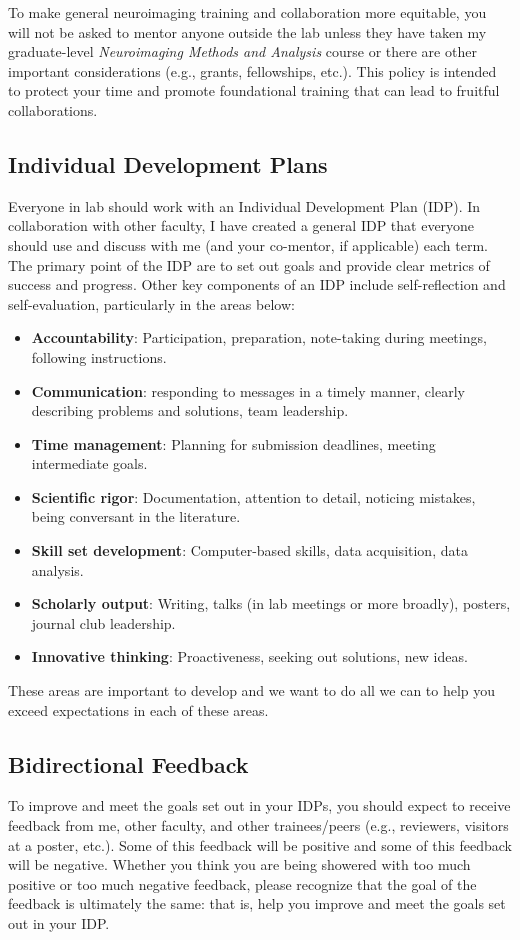 \documentclass[letterpaper,11pt,oneside]{memoir}
\begin{document}
To make general neuroimaging training and collaboration more equitable, you will not be asked to mentor anyone outside the lab unless they have taken my graduate-level \textit{Neuroimaging Methods and Analysis} course or there are other important considerations (e.g., grants, fellowships, etc.). This policy is intended to protect your time and promote foundational training that can lead to fruitful collaborations. 

\subsection{Individual Development Plans}
Everyone in lab should work with an Individual Development Plan (IDP). In collaboration with other faculty, I have created a general IDP that everyone should use and discuss with me (and your co-mentor, if applicable) each term. The primary point of the IDP are to set out goals and provide clear metrics of success and progress. Other key components of an IDP include self-reflection and self-evaluation, particularly in the areas below:

\begin{itemize}[noitemsep,nolistsep]
\item \textbf{Accountability}: Participation, preparation, note-taking during meetings, following instructions.
\item \textbf{Communication}: responding to messages in a timely manner, clearly describing problems and solutions, team leadership.
\item \textbf{Time management}: Planning for submission deadlines, meeting intermediate goals.
\item \textbf{Scientific rigor}: Documentation, attention to detail, noticing mistakes, being conversant in the literature.
\item \textbf{Skill set development}: Computer-based skills, data acquisition, data analysis.
\item \textbf{Scholarly output}: Writing, talks (in lab meetings or more broadly), posters, journal club leadership.
\item \textbf{Innovative thinking}: Proactiveness, seeking out solutions, new ideas.
\end{itemize}

These areas are important to develop and we want to do all we can to help you exceed expectations in each of these areas.

\subsection{Bidirectional Feedback}
To improve and meet the goals set out in your IDPs, you should expect to receive feedback from me, other faculty, and other trainees/peers (e.g., reviewers, visitors at a poster, etc.). Some of this feedback will be positive and some of this feedback will be negative. Whether you think you are being showered with too much positive or too much negative feedback, please recognize that the goal of the feedback is ultimately the same: that is, help you improve and meet the goals set out in your IDP. 
\end{document}
